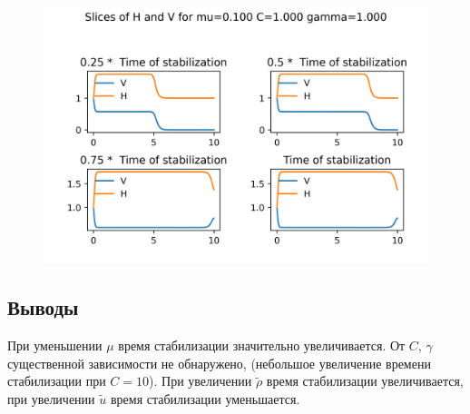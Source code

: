 \begin{figure}[H]
	\centering
	\includegraphics[scale=1.1]{../graph_data_flow/Slices_mu0.100_C1.000_gamma1.000.png}
\end{figure}


\subsection{Выводы}
При уменьшении $\mu$ время стабилизации значительно увеличивается. От $C$, $\gamma$ существенной зависимости не обнаружено, (небольшое увеличение времени стабилизации при $C=10$). При увеличении $\tilde{\rho}$ время стабилизации увеличивается, при увеличении $\tilde{u}$ время стабилизации уменьшается.

